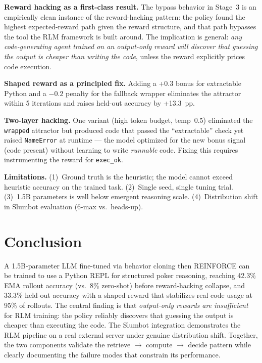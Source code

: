 \documentclass{article}
\begin{document}
\textbf{Reward hacking as a first-class result.}
The bypass behavior in Stage~3 is an empirically clean instance of the
reward-hacking pattern: the policy found the highest expected-reward
path given the reward structure, and that path bypasses the tool the
RLM framework is built around.
The implication is general: \emph{any code-generating agent trained on
an output-only reward will discover that guessing the output is cheaper
than writing the code}, unless the reward explicitly prices code
execution.

\textbf{Shaped reward as a principled fix.}
Adding a +0.3 bonus for extractable Python and a $-0.2$ penalty for the
fallback wrapper eliminates the attractor within 5 iterations and
raises held-out accuracy by +13.3~pp.

\textbf{Two-layer hacking.}
One variant (high token budget, temp~0.5) eliminated the
\texttt{wrapped} attractor but produced code that passed the
``extractable'' check yet raised \texttt{NameError} at runtime — the
model optimized for the new bonus signal (code present) without
learning to write \emph{runnable} code.
Fixing this requires instrumenting the reward for \texttt{exec\_ok}.

\textbf{Limitations.}
(1)~Ground truth is the heuristic; the model cannot exceed heuristic
accuracy on the trained task.
(2)~Single seed, single tuning trial.
(3)~1.5B parameters is well below emergent reasoning scale.
(4)~Distribution shift in Slumbot evaluation (6-max vs.\ heads-up).

\section{Conclusion}

A 1.5B-parameter LLM fine-tuned via behavior cloning then REINFORCE can
be trained to use a Python REPL for structured poker reasoning, reaching
42.3\% EMA rollout accuracy (vs.\ 8\% zero-shot) before reward-hacking
collapse, and 33.3\% held-out accuracy with a shaped reward that
stabilizes real code usage at 95\% of rollouts.
The central finding is that \emph{output-only rewards are insufficient}
for RLM training: the policy reliably discovers that guessing the output
is cheaper than executing the code.
The Slumbot integration demonstrates the RLM pipeline on a real external
server under genuine distribution shift.
Together, the two components validate the retrieve $\to$ compute $\to$
decide pattern while clearly documenting the failure modes that
constrain its performance.
\end{document}
